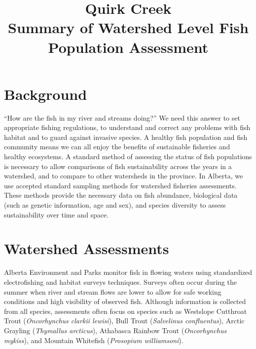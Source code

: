 \documentclass[]{article}\usepackage[]{graphicx}\usepackage[]{color}
\newlength{\storeparskip}
\begin{document}


 



\newcommand{\mylarge}{\fontsize{16}{20}\selectfont}
\newcommand{\myLarge}{\fontsize{36}{50}\selectfont}
\newcommand{\myLARGE}{\fontsize{43}{54}\selectfont}


\title{Quirk Creek\\ Summary of Watershed Level Fish Population Assessment}
\date{}



\maketitle


\setcounter{tocdepth}{2}
{\setlength{\parskip}{\storeparskip}%
\tableofcontents
}
\clearpage



\section{Background}
\noindent ``How are the fish in my river and streams doing?''
We need this answer to set appropriate fishing regulations, 
to understand and correct any problems with fish habitat and 
to guard against invasive species.  
A healthy fish population and fish community means we 
can all enjoy the benefits of sustainable fisheries 
and healthy ecosystems. 
A standard method of assessing the status of 
fish populations is necessary to allow comparisons of fish sustainability 
across the years in a watershed, and to compare to other 
watersheds in the province. 
In Alberta, we use accepted standard sampling methods for
watershed fisheries assessments. 
These methods provide the necessary data on fish abundance, 
biological data (such as genetic information, age and sex), 
and species diversity to assess sustainability over time and space.

\section{Watershed Assessments}
\noindent Alberta Environment and Parks monitor fish in flowing waters using 
standardized electrofishing and habitat surveys techniques. 
Surveys often occur during the summer when river and stream 
flows are lower to allow for safe working conditions and high 
visibility of observed fish.  Although information is collected 
from all species, assessments often focus on species such as
Westslope Cutthroat Trout ({\it Oncorhynchus clarkii lewisi}), 
Bull Trout ({\it Salvelinus confluentus}), 
Arctic Grayling ({\it Thymallus arcticus}), 
Athabasca Rainbow Trout ({\it Oncorhynchus mykiss}), 
and Mountain Whitefish ({\it Prosopium williamsoni}).
\end{document}
